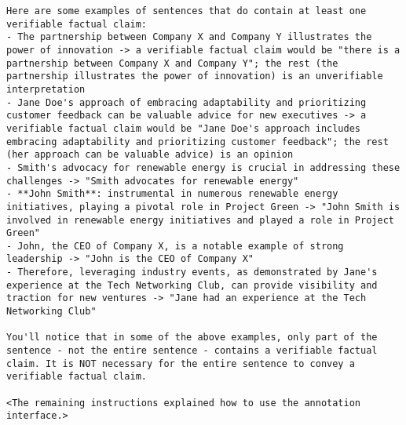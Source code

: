 \begin{tcolorbox}
\begin{lstlisting}[breaklines=true, breakindent=0pt, basicstyle=\small\ttfamily\raggedright, xleftmargin=-5pt, frame=none, xrightmargin=-5pt, aboveskip=-2pt, belowskip=-2pt]
Here are some examples of sentences that do contain at least one verifiable factual claim:
- The partnership between Company X and Company Y illustrates the power of innovation -> a verifiable factual claim would be "there is a partnership between Company X and Company Y"; the rest (the partnership illustrates the power of innovation) is an unverifiable interpretation
- Jane Doe's approach of embracing adaptability and prioritizing customer feedback can be valuable advice for new executives -> a verifiable factual claim would be "Jane Doe's approach includes embracing adaptability and prioritizing customer feedback"; the rest (her approach can be valuable advice) is an opinion
- Smith's advocacy for renewable energy is crucial in addressing these challenges -> "Smith advocates for renewable energy"
- **John Smith**: instrumental in numerous renewable energy initiatives, playing a pivotal role in Project Green -> "John Smith is involved in renewable energy initiatives and played a role in Project Green"
- John, the CEO of Company X, is a notable example of strong leadership -> "John is the CEO of Company X"
- Therefore, leveraging industry events, as demonstrated by Jane's experience at the Tech Networking Club, can provide visibility and traction for new ventures -> "Jane had an experience at the Tech Networking Club"

You'll notice that in some of the above examples, only part of the sentence - not the entire sentence - contains a verifiable factual claim. It is NOT necessary for the entire sentence to convey a verifiable factual claim.

<The remaining instructions explained how to use the annotation interface.>
\end{lstlisting}
\end{tcolorbox}
